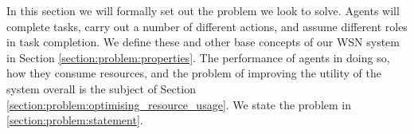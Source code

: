
In this section we will formally set out the problem we look to solve.  Agents will complete tasks, carry out a number of different actions, and assume different roles in task completion. We define these and other base concepts of our WSN system in Section \ref{section:problem:properties}. The performance of agents in doing so, how they consume resources, and the problem of improving the utility of the system overall is the subject of Section \ref{section:problem:optimising_resource_usage}. We state the problem in \ref{section:problem:statement}.